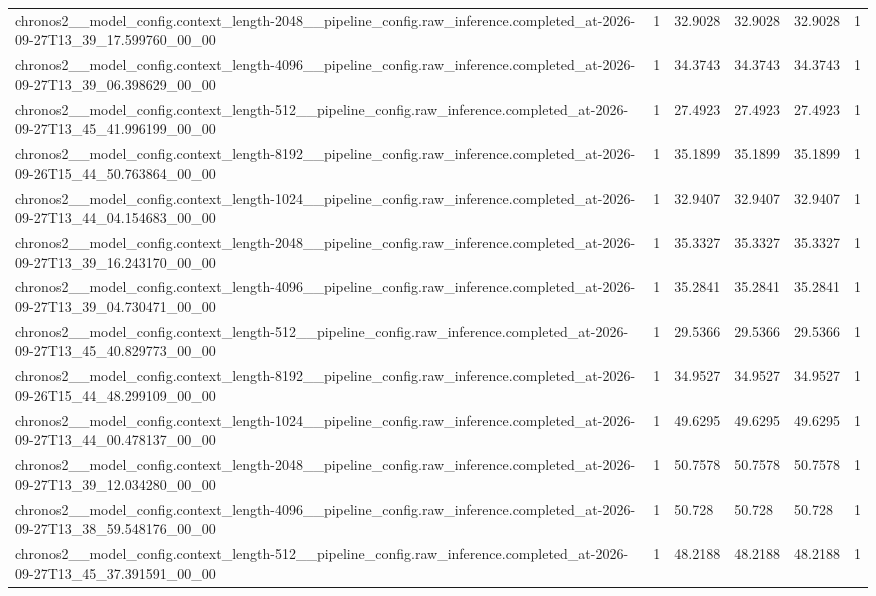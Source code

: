 \begin{tabular}{llllll}
chronos2\_\_model\_config.context\_length-2048\_\_pipeline\_config.raw\_inference.completed\_at-2026-09-27T13\_39\_17.599760\_00\_00 & 1 & 32.9028 & 32.9028 & 32.9028 & 1 \\
chronos2\_\_model\_config.context\_length-4096\_\_pipeline\_config.raw\_inference.completed\_at-2026-09-27T13\_39\_06.398629\_00\_00 & 1 & 34.3743 & 34.3743 & 34.3743 & 1 \\
chronos2\_\_model\_config.context\_length-512\_\_pipeline\_config.raw\_inference.completed\_at-2026-09-27T13\_45\_41.996199\_00\_00 & 1 & 27.4923 & 27.4923 & 27.4923 & 1 \\
chronos2\_\_model\_config.context\_length-8192\_\_pipeline\_config.raw\_inference.completed\_at-2026-09-26T15\_44\_50.763864\_00\_00 & 1 & 35.1899 & 35.1899 & 35.1899 & 1 \\
chronos2\_\_model\_config.context\_length-1024\_\_pipeline\_config.raw\_inference.completed\_at-2026-09-27T13\_44\_04.154683\_00\_00 & 1 & 32.9407 & 32.9407 & 32.9407 & 1 \\
chronos2\_\_model\_config.context\_length-2048\_\_pipeline\_config.raw\_inference.completed\_at-2026-09-27T13\_39\_16.243170\_00\_00 & 1 & 35.3327 & 35.3327 & 35.3327 & 1 \\
chronos2\_\_model\_config.context\_length-4096\_\_pipeline\_config.raw\_inference.completed\_at-2026-09-27T13\_39\_04.730471\_00\_00 & 1 & 35.2841 & 35.2841 & 35.2841 & 1 \\
chronos2\_\_model\_config.context\_length-512\_\_pipeline\_config.raw\_inference.completed\_at-2026-09-27T13\_45\_40.829773\_00\_00 & 1 & 29.5366 & 29.5366 & 29.5366 & 1 \\
chronos2\_\_model\_config.context\_length-8192\_\_pipeline\_config.raw\_inference.completed\_at-2026-09-26T15\_44\_48.299109\_00\_00 & 1 & 34.9527 & 34.9527 & 34.9527 & 1 \\
chronos2\_\_model\_config.context\_length-1024\_\_pipeline\_config.raw\_inference.completed\_at-2026-09-27T13\_44\_00.478137\_00\_00 & 1 & 49.6295 & 49.6295 & 49.6295 & 1 \\
chronos2\_\_model\_config.context\_length-2048\_\_pipeline\_config.raw\_inference.completed\_at-2026-09-27T13\_39\_12.034280\_00\_00 & 1 & 50.7578 & 50.7578 & 50.7578 & 1 \\
chronos2\_\_model\_config.context\_length-4096\_\_pipeline\_config.raw\_inference.completed\_at-2026-09-27T13\_38\_59.548176\_00\_00 & 1 & 50.728 & 50.728 & 50.728 & 1 \\
chronos2\_\_model\_config.context\_length-512\_\_pipeline\_config.raw\_inference.completed\_at-2026-09-27T13\_45\_37.391591\_00\_00 & 1 & 48.2188 & 48.2188 & 48.2188 & 1 \\

\end{tabular}
